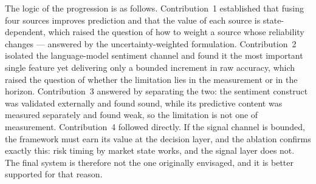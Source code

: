The logic of the progression is as follows. Contribution~1 established that fusing four
sources improves prediction and that the value of each source is state-dependent, which
raised the question of how to weight a source whose reliability changes --- answered by
the uncertainty-weighted formulation. Contribution~2 isolated the language-model sentiment
channel and found it the most important single feature yet delivering only a bounded
increment in raw accuracy, which raised the question of whether the limitation lies in the
measurement or in the horizon. Contribution~3 answered by separating the two: the
sentiment construct was validated externally and found sound, while its predictive content
was measured separately and found weak, so the limitation is not one of measurement.
Contribution~4 followed directly. If the signal channel is bounded, the framework must
earn its value at the decision layer, and the ablation confirms exactly this: risk timing
by market state works, and the signal layer does not. The final system is therefore not
the one originally envisaged, and it is better supported for that reason.

